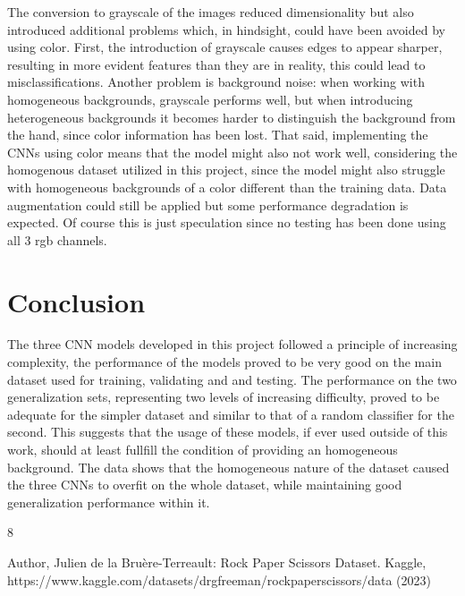 \documentclass[runningheads]{llncs}
\begin{document}
The conversion to grayscale of the images reduced dimensionality but also introduced additional problems which, in hindsight, could have been avoided by using color. First, the introduction of grayscale causes edges to appear sharper, resulting in more evident features than they are in reality, this could lead to misclassifications. Another problem is background noise: when working with homogeneous backgrounds, grayscale performs well, but when introducing heterogeneous backgrounds it becomes harder to distinguish the background from the hand, since color information has been lost. That said, implementing the CNNs using color means that the model might also not work well, considering the homogenous dataset utilized in this project, since the model might also struggle with homogeneous backgrounds of a color different than the training data. Data augmentation could still be applied but some performance degradation is expected. Of course this is just speculation since no testing has been done using all 3 rgb channels. 

\section{Conclusion}

The three CNN models developed in this project followed a principle of increasing complexity, the performance of the models proved to be very good on the main dataset used for training, validating and and testing. The performance on the two generalization sets, representing two levels of increasing difficulty, proved to be adequate for the simpler dataset and similar to that of a random classifier for the second. This suggests that the usage of these models, if ever used outside of this work, should at least fullfill the condition of providing an homogeneous background. The data shows that the homogeneous nature of the dataset caused the three CNNs to overfit on the whole dataset, while maintaining good generalization performance within it.     




    








%
%
%
% 
% 
%
\begin{thebibliography}{8}


Author, Julien de la Bruère-Terreault: Rock Paper Scissors Dataset. Kaggle, https://www.kaggle.com/datasets/drgfreeman/rockpaperscissors/data (2023)
\end{thebibliography}
\end{document}
